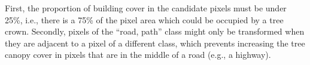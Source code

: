\documentclass[10pt,letterpaper]{article}
\begin{document}
First, the proportion of building cover in the candidate pixels must be under 25\%, i.e., there is a 75\% of the pixel area which could be occupied by a tree crown.
Secondly, pixels of the ``road, path'' class might only be transformed when they are adjacent to a pixel of a different class, which prevents increasing the tree canopy cover in pixels that are in the middle of a road (e.g., a highway).
\end{document}
